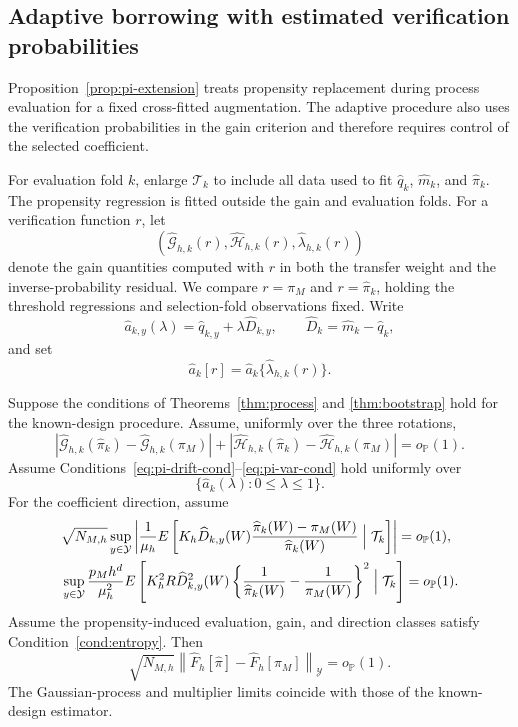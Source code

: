 \subsection{Adaptive borrowing with estimated verification probabilities}
\label{sec:supp-pi-adaptive}

Proposition~\ref{prop:pi-extension} treats propensity replacement during process evaluation for a fixed cross-fitted augmentation. The adaptive procedure also uses the verification probabilities in the gain criterion and therefore requires control of the selected coefficient.

For evaluation fold \(k\), enlarge \(\mathcal T_k\) to include all data used to fit \(\widehat q_k\), \(\widehat m_k\), and \(\widehat\pi_k\). The propensity regression is fitted outside the gain and evaluation folds. For a verification function \(r\), let
\[
(\widehat{\mathcal G}_{h,k}(r),
 \widehat{\mathcal H}_{h,k}(r),
 \widehat\lambda_{h,k}(r))
\]
denote the gain quantities computed with \(r\) in both the transfer weight and the inverse-probability residual. We compare \(r=\pi_M\) and \(r=\widehat\pi_k\), holding the threshold regressions and selection-fold observations fixed. Write
\[
\widehat a_{k,y}(\lambda)
=
\widehat q_{k,y}
+
\lambda\widehat D_{k,y},
\qquad
\widehat D_k=\widehat m_k-\widehat q_k,
\]
and set
\[
\widehat a_k[r]
=
\widehat a_k\{\widehat\lambda_{h,k}(r)\}.
\]

\begin{proposition}
\label{prop:pi-adaptive}
Suppose the conditions of Theorems~\ref{thm:process} and \ref{thm:bootstrap} hold for the known-design procedure. Assume, uniformly over the three rotations,
\begin{equation}
|\widehat{\mathcal G}_{h,k}(\widehat\pi_k)
 -\widehat{\mathcal G}_{h,k}(\pi_M)|
+
|\widehat{\mathcal H}_{h,k}(\widehat\pi_k)
 -\widehat{\mathcal H}_{h,k}(\pi_M)|
=o_{\mathbb P}(1).
\label{eq:pi-gain-perturbation}
\end{equation}
Assume Conditions~\eqref{eq:pi-drift-cond}--\eqref{eq:pi-var-cond} hold uniformly over
\[
\{\widehat a_k(\lambda):0\le\lambda\le1\}.
\]
For the coefficient direction, assume
\begin{align}
&\sqrt{N_{M,h}}
\sup_{y\in\mathcal Y}
\left|
\frac1{\mu_h}
E\left[
K_h\widehat D_{k,y}(W)
\frac{\widehat\pi_k(W)-\pi_M(W)}{\widehat\pi_k(W)}
\Bigm|\mathcal T_k
\right]
\right|
=o_{\mathbb P}(1),
\label{eq:pi-D-drift}\\
&\sup_{y\in\mathcal Y}
\frac{p_Mh^d}{\mu_h^2}
E\left[
K_h^2R\widehat D_{k,y}^2(W)
\left\{\frac1{\widehat\pi_k(W)}-\frac1{\pi_M(W)}\right\}^2
\Bigm|\mathcal T_k
\right]
=o_{\mathbb P}(1).
\label{eq:pi-D-variance}
\end{align}
Assume the propensity-induced evaluation, gain, and direction classes satisfy Condition~\ref{cond:entropy}. Then
\begin{equation}
\sqrt{N_{M,h}}
\left\|
\widehat F_h[\widehat\pi]
-
\widehat F_h[\pi_M]
\right\|_{\mathcal Y}
=o_{\mathbb P}(1).
\label{eq:pi-adaptive-equivalence}
\end{equation}
The Gaussian-process and multiplier limits coincide with those of the known-design estimator.
\end{proposition}


